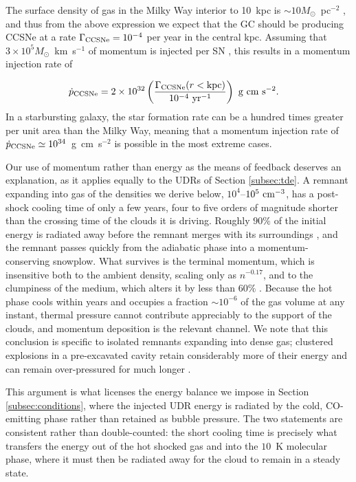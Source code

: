 \documentclass[preprint2]{aastex}
\begin{document}
The surface density of gas in the Milky Way interior to 10~kpc is $\sim 10 M_{\odot}$~pc$^{-2}$ \citep{Kalberla:2009a}, and thus from the above expression we expect that the GC should be producing CCSNe at a rate $\Gamma_{\rm CCSNe} = 10^{-4}$ per year in the central kpc. Assuming that $3 \times 10^{5} M_{\odot}$~{\rm km~s}$^{-1}$ of momentum is injected per SN \citep{Kim:2015a}, this results in a momentum injection rate of 

\begin{align}
\dot{p}_{\rm CCSNe} &= 2 \times 10^{32} \left(\frac{\Gamma_{\rm CCSNe} (r < {\rm kpc})}{10^{-4}~{\rm yr}^{-1}}\right)~{\rm g~cm~s}^{-2}\label{eq:psne}.
\end{align}
In a starbursting galaxy, the star formation rate can be a hundred times greater per unit area than the Milky Way, meaning that a momentum injection rate of $\dot{p}_{\rm CCSNe} \simeq 10^{34}$~{\rm g~cm~s}$^{-2}$ is possible in the most extreme cases.

Our use of momentum rather than energy as the means of feedback deserves an explanation, as it applies equally to the UDRs of Section \ref{subsec:tde}. A remnant expanding into gas of the densities we derive below, $10^{4}$--$10^{5}~{\rm cm}^{-3}$, has a post-shock cooling time of only a few years, four to five orders of magnitude shorter than the crossing time of the clouds it is driving. Roughly $90\%$ of the initial energy is radiated away before the remnant merges with its surroundings \citep{Cioffi:1988a,Blondin:1998a,Thornton:1998a}, and the remnant passes quickly from the adiabatic phase into a momentum-conserving snowplow. What survives is the terminal momentum, which is insensitive both to the ambient density, scaling only as $n^{-0.17}$, and to the clumpiness of the medium, which alters it by less than $60\%$ \citep{Kim:2015a,Martizzi:2015a,Walch:2015a}. Because the hot phase cools within years and occupies a fraction $\sim 10^{-6}$ of the gas volume at any instant, thermal pressure cannot contribute appreciably to the support of the clouds, and momentum deposition is the relevant channel. We note that this conclusion is specific to isolated remnants expanding into dense gas; clustered explosions in a pre-excavated cavity retain considerably more of their energy and can remain over-pressured for much longer \citep{Gentry:2017a}.

This argument is what licenses the energy balance we impose in Section \ref{subsec:conditions}, where the injected UDR energy is radiated by the cold, CO-emitting phase rather than retained as bubble pressure. The two statements are consistent rather than double-counted: the short cooling time is precisely what transfers the energy out of the hot shocked gas and into the $10$~K molecular phase, where it must then be radiated away for the cloud to remain in a steady state.
\end{document}
